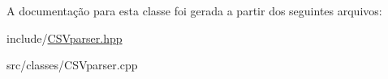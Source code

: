 A documentação para esta classe foi gerada a partir dos seguintes arquivos\+:\begin{DoxyCompactItemize}
\item 
include/\hyperlink{CSVparser_8hpp}{C\+S\+Vparser.\+hpp}\item 
src/classes/C\+S\+Vparser.\+cpp\end{DoxyCompactItemize}
